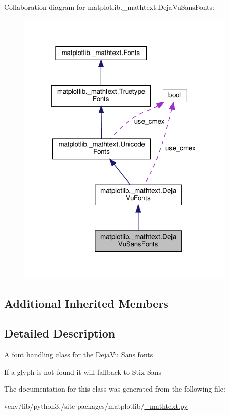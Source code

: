 Collaboration diagram for matplotlib.\+\_\+mathtext.\+Deja\+Vu\+Sans\+Fonts\+:
\nopagebreak
\begin{figure}[H]
\begin{center}
\leavevmode
\includegraphics[width=294pt]{classmatplotlib_1_1__mathtext_1_1DejaVuSansFonts__coll__graph}
\end{center}
\end{figure}
\subsection*{Additional Inherited Members}


\subsection{Detailed Description}
\begin{DoxyVerb}A font handling class for the DejaVu Sans fonts

If a glyph is not found it will fallback to Stix Sans
\end{DoxyVerb}
 

The documentation for this class was generated from the following file\+:\begin{DoxyCompactItemize}
\item 
venv/lib/python3./site-\/packages/matplotlib/\hyperlink{__mathtext_8py}{\+\_\+mathtext.\+py}\end{DoxyCompactItemize}
